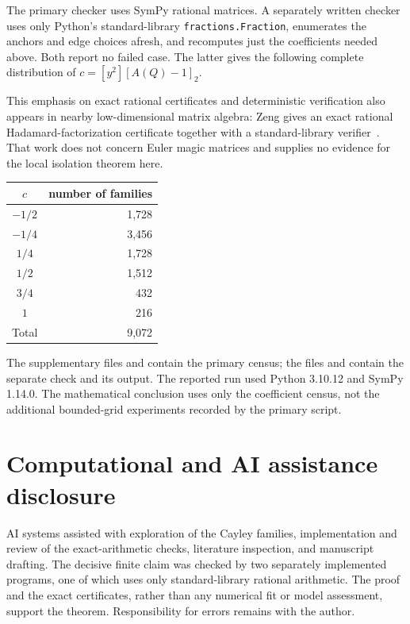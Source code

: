 \documentclass[11pt]{article}
\begin{document}
The primary checker uses SymPy rational matrices.  A separately written
checker uses only Python's standard-library \texttt{fractions.Fraction},
enumerates the anchors and edge choices afresh, and recomputes just the
coefficients needed above.  Both report no failed case.  The latter gives the
following complete distribution of $c=[y^2][A(Q)-1]_2$.

This emphasis on exact rational certificates and deterministic verification
also appears in nearby low-dimensional matrix algebra: Zeng gives an exact
rational Hadamard-factorization certificate together with a standard-library
verifier~\cite{Zeng2026Zenodo22242517}.  That work does not concern Euler
magic matrices and supplies no evidence for the local isolation theorem here.
\begin{center}
\begin{tabular}{@{}cr@{}}
\toprule
$c$ & number of families \\
\midrule
$-1/2$ & 1,728 \\
$-1/4$ & 3,456 \\
$ 1/4$ & 1,728 \\
$ 1/2$ & 1,512 \\
$ 3/4$ &   432 \\
$ 1$   &   216 \\
\midrule
Total & 9,072 \\
\bottomrule
\end{tabular}
\end{center}
The supplementary files  and
 contain the primary census; the files
 and
 contain the separate check and
its output.  The reported run used Python 3.10.12 and SymPy 1.14.0.
The mathematical conclusion uses only the coefficient census, not the
additional bounded-grid experiments recorded by the primary script.

\section*{Computational and AI assistance disclosure}

AI systems assisted with exploration of the Cayley families, implementation
and review of the exact-arithmetic checks, literature inspection, and
manuscript drafting.  The decisive finite claim was checked by two separately
implemented programs, one of which uses only standard-library rational
arithmetic.  The proof and the exact certificates, rather than any numerical
fit or model assessment, support the theorem.  Responsibility for errors
remains with the author.



\end{document}
